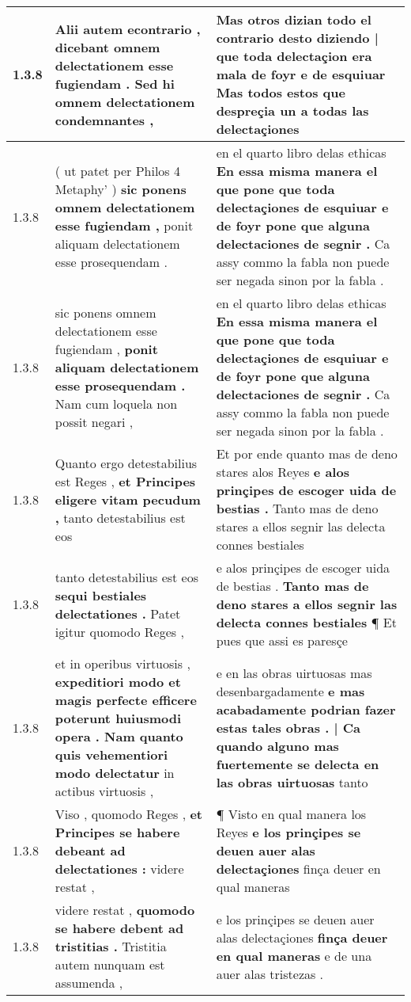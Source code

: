 \begin{tabular}{|p{1cm}|p{6.5cm}|p{6.5cm}|}
1.3.8 & Alii autem econtrario , \textbf{ dicebant omnem delectationem esse fugiendam . } Sed hi omnem delectationem condemnantes , & Mas otros dizian todo el contrario desto \textbf{ diziendo | que toda delectaçion era mala de foyr e de esquiuar } Mas todos estos que despreçia un a todas las delectaçiones \\\hline
1.3.8 & ( ut patet per Philos 4 Metaphy’ ) \textbf{ sic ponens omnem delectationem esse fugiendam , } ponit aliquam delectationem esse prosequendam . & en el quarto libro delas ethicas \textbf{ En essa misma manera el que pone que toda delectaçiones de esquiuar e de foyr pone que alguna delectaciones de segnir . } Ca assy commo la fabla non puede ser negada sinon por la fabla . \\\hline
1.3.8 & sic ponens omnem delectationem esse fugiendam , \textbf{ ponit aliquam delectationem esse prosequendam . } Nam cum loquela non possit negari , & en el quarto libro delas ethicas \textbf{ En essa misma manera el que pone que toda delectaçiones de esquiuar e de foyr pone que alguna delectaciones de segnir . } Ca assy commo la fabla non puede ser negada sinon por la fabla . \\\hline
1.3.8 & Quanto ergo detestabilius est Reges , \textbf{ et Principes eligere vitam pecudum , } tanto detestabilius est eos & Et por ende quanto mas de deno stares alos Reyes \textbf{ e alos prinçipes de escoger uida de bestias . } Tanto mas de deno stares a ellos segnir las delecta connes bestiales \\\hline
1.3.8 & tanto detestabilius est eos \textbf{ sequi bestiales delectationes . } Patet igitur quomodo Reges , & e alos prinçipes de escoger uida de bestias . \textbf{ Tanto mas de deno stares a ellos segnir las delecta connes bestiales } ¶ Et pues que assi es paresçe \\\hline
1.3.8 & et in operibus virtuosis , \textbf{ expeditiori modo et magis perfecte efficere poterunt huiusmodi opera . Nam quanto quis vehementiori modo delectatur } in actibus virtuosis , & e en las obras uirtuosas mas desenbargadamente \textbf{ e mas acabadamente podrian fazer estas tales obras . | Ca quando alguno mas fuertemente se delecta en las obras uirtuosas } tanto \\\hline
1.3.8 & Viso , quomodo Reges , \textbf{ et Principes se habere debeant ad delectationes : } videre restat , & ¶ Visto en qual manera los Reyes \textbf{ e los prinçipes se deuen auer alas delectaçiones } finça deuer en qual maneras \\\hline
1.3.8 & videre restat , \textbf{ quomodo se habere debent ad tristitias . } Tristitia autem nunquam est assumenda , & e los prinçipes se deuen auer alas delectaçiones \textbf{ finça deuer en qual maneras } e de una auer alas tristezas . \\\hline

\end{tabular}
